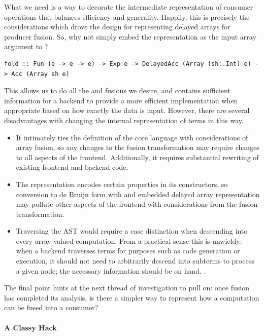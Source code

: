 What we need is a way to decorate the intermediate representation of consumer
operations that balances efficiency and generality. Happily, this is precisely
the considerations which drove the design for representing delayed arrays for
producer fusion. So, why not simply embed the  representation
as the input array argument to ?
%
\begin{lstlisting}[style=haskell,numbers=none]
fold :: Fun (e -> e -> e) -> Exp e -> DelayedAcc (Array (sh:.Int) e) -> Acc (Array sh e)
\end{lstlisting}
%
This allows us to do all the  and 
fusions we desire, and contains sufficient information for a backend to provide
a more efficient implementation when appropriate based on how exactly the data
is input. However, there are several disadvantages with changing the internal
representation of terms in this way.
%
\begin{itemize}
    \item It intimately ties the definition of the core language with
        considerations of array fusion, so any changes to the fusion
        transformation may require changes to all aspects of the frontend.
        Additionally, it requires substantial rewriting of existing frontend and
        backend code.

    \item The  representation encodes certain properties in
        its constructors, so conversion to de Bruijn form with and embedded
        delayed array representation may pollute other aspects of the frontend
        with considerations from the fusion transformation.

    \item Traversing the AST would require a case distinction when descending
        into every array valued computation. From a practical sense this is
        unwieldy: when a backend traverses terms for purposes such as code
        generation or execution, it should not need to arbitrarily descend into
        subterms to process a given node; the necessary information should be on
        hand. .
\end{itemize}
%
The final point hints at the next thread of investigation to pull on: once
fusion has completed its analysis, is there a simpler way to represent how a
computation can be fused into a consumer?


\paragraph{A Classy Hack}

